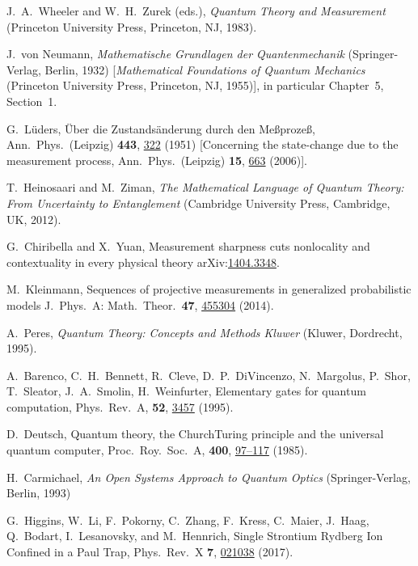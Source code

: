 \documentclass[12pt,
onecolumn,
superscriptaddress,
floatfix,
]{revtex4-2}
\renewcommand{\doi}[2]{{\href{http://doi.org/#1}{#2}}}
\newcommand{\XXX}[1]{{\color{red}[\texttt{XXX}~{#1}~\texttt{XXX}]}}
\begin{document}
\begin{thebibliography}{99}

%
J.\ A.\ Wheeler and W.\ H.\ Zurek (eds.),
\emph{Quantum Theory and Measurement}
(Princeton University Press, Princeton, NJ, 1983).

%
J.\ von Neumann,
\emph{Mathematische Grundlagen der Quantenmechanik}
(Springer-Verlag, Berlin, 1932)
[\emph{Mathematical Foundations of Quantum Mechanics}
(Princeton University Press, Princeton, NJ, 1955)],
in particular Chapter~5, Section~1.

%
G.\ Lüders,
Über die Zustandsänderung durch den Meßprozeß,
Ann.\ Phys.\ (Leipzig) \textbf{443}, \doi{10.1002/andp.19504430510}{322} (1951)
[Concerning the state-change due to the measurement process,
Ann.\ Phys.\ (Leipzig) \textbf{15}, \doi{10.1002/andp.200610207}{663} (2006)].

%
T.\ Heinosaari and M.\ Ziman,
\emph{The Mathematical Language of Quantum Theory: From Uncertainty to Entanglement}
(Cambridge University Press, Cambridge, UK, 2012).

%
G.\ Chiribella and X.\ Yuan,
Measurement sharpness cuts nonlocality and contextuality in every physical theory
arXiv:\href{https://arXiv.org/abs/1404.3348}{1404.3348}.

%
M.\ Kleinmann,
Sequences of projective measurements in generalized probabilistic models
J.\ Phys.\ A: Math.\ Theor.\ \textbf{47}, \doi{10.1088/1751-8113/47/45/455304}{455304} (2014).

%
A.\ Peres,
\emph{Quantum Theory: Concepts and Methods Kluwer}
(Kluwer, Dordrecht, 1995).

%
A.\ Barenco, C.\ H.\ Bennett, R.\ Cleve, D.\ P.\ DiVincenzo, N.\ Margolus, P.\ Shor, T.\ Sleator, J.\ A.\ Smolin, H.\ Weinfurter,
Elementary gates for quantum computation,
Phys.\ Rev.\ A, \textbf{52}, \doi{10.1103/PhysRevA.52.3457}{3457} (1995).

%
D.\ Deutsch,
Quantum theory, the Church{\textendash}Turing principle and the universal quantum computer,
Proc.\ Roy.\ Soc.\ A, \textbf{400}, \doi{10.1098/rspa.1985.0070}{97--117} (1985).

%
H.\ Carmichael,
\emph{An Open Systems Approach to Quantum Optics}
(Springer-Verlag, Berlin, 1993) 


%
G.\ Higgins, W.\ Li, F.\ Pokorny, C.\ Zhang, F.\ Kress, C.\ Maier, J.\ Haag, Q.\ Bodart, I.\ Lesanovsky, and M.\ Hennrich,
Single Strontium Rydberg Ion Confined in a Paul Trap,
Phys.\ Rev.\ X \textbf{7}, \doi{10.1103/PhysRevX.7.021038}{021038} (2017).


\end{thebibliography}
\end{document}
